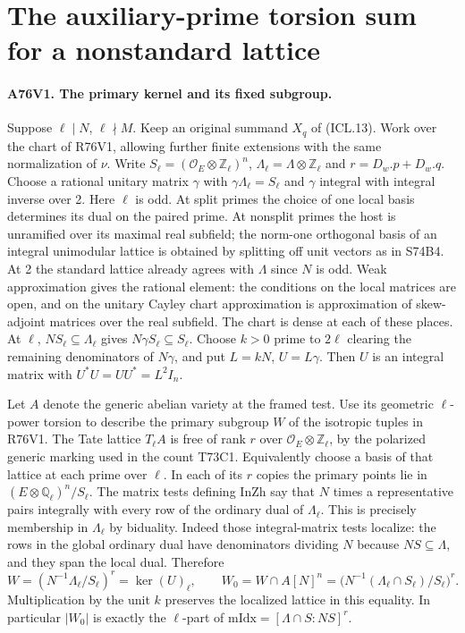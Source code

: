 \section{The auxiliary-prime torsion sum for a nonstandard lattice}

\paragraph{A76V1. The primary kernel and its fixed subgroup.}
Suppose $\ell\mid N$, $\ell\nmid M$. Keep an original summand
$X_q$ of (ICL.13). Work over the chart of R76V1, allowing
further finite extensions with the same normalization of $\nu$.
Write $S_\ell=(\mathcal O_E\otimes\mathbb Z_\ell)^n$,
$\Lambda_\ell=\Lambda\otimes\mathbb Z_\ell$ and $r=D_w.p+D_w.q$.
Choose a rational unitary matrix $\gamma$ with
$\gamma\Lambda_\ell=S_\ell$ and $\gamma$ integral with integral
inverse over 2. Here $\ell$ is odd. At split primes the choice
of one local basis determines its dual on the paired prime. At
nonsplit primes the host is unramified over its maximal real
subfield; the norm-one orthogonal basis of an integral unimodular
lattice is obtained by splitting off unit vectors as in S74B4.
At 2 the standard lattice already agrees with $\Lambda$ since
$N$ is odd. Weak approximation gives the rational element:
the conditions on the local matrices are open, and on the
unitary Cayley chart approximation is approximation of
skew-adjoint matrices over the real subfield. The chart is
dense at each of these places. At $\ell$, $NS_\ell\subseteq
\Lambda_\ell$ gives $N\gamma S_\ell\subseteq S_\ell$. Choose
$k>0$ prime to $2\ell$ clearing the remaining denominators of
$N\gamma$, and put $L=kN$, $U=L\gamma$. Then $U$ is an
integral matrix with $U^*U=UU^*=L^2 I_n$.

Let $A$ denote the generic abelian variety at the framed test.
Use its geometric $\ell$-power torsion to describe the primary
subgroup $W$ of the isotropic tuples in R76V1. The Tate lattice
$T_\ell A$ is free of rank $r$ over
$\mathcal O_E\otimes\mathbb Z_\ell$, by the polarized generic
marking used in the count T73C1. Equivalently choose a basis
of that lattice at each prime over $\ell$. In each of its $r$
copies the primary points lie in
$(E\otimes\mathbb Q_\ell)^n/S_\ell$. The matrix tests defining
$\mathrm{InZh}$ say that $N$ times a representative pairs
integrally with every row of the ordinary dual of $\Lambda_\ell$.
This is precisely membership in $\Lambda_\ell$ by biduality.
Indeed those integral-matrix tests localize: the rows in the
global ordinary dual have denominators dividing $N$ because
$NS\subseteq\Lambda$, and they span the local dual. Therefore
\[
 W=(N^{-1}\Lambda_\ell/S_\ell)^r=\ker(U)_\ell,\qquad
 W_0=W\cap A[N]^n
      =\big(N^{-1}(\Lambda_\ell\cap S_\ell)/S_\ell\big)^r .
\]
Multiplication by the unit $k$ preserves the localized lattice in
this equality. In particular $|W_0|$ is exactly the $\ell$-part
of $\mathrm{mIdx}=[\Lambda\cap S:NS]^r$.

